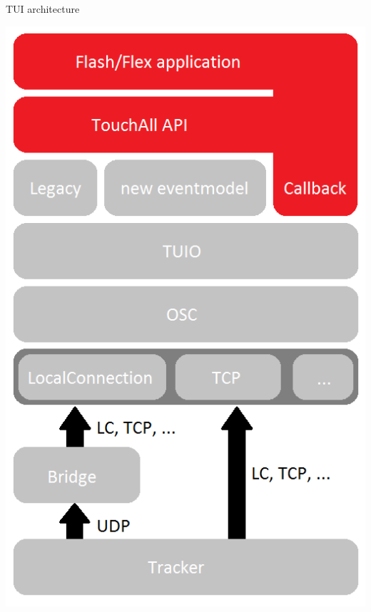 \begin{frame}
\begin{block}{TUI architecture}
\begin{minipage}{1.0\linewidth}
\begin{center}
\begin{minipage}{.49\linewidth}
\includegraphics[scale=0.33]{images/as3LibDiagram.png} 
\end{minipage}
\end{center}
\end{minipage}
\end{block}
\end{frame}


